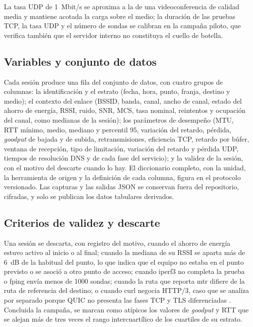 La tasa UDP de 1~Mbit/s se aproxima a la de una videoconferencia de calidad media y mantiene acotada la carga sobre el medio; la duración de las pruebas TCP, la tasa UDP y el número de sondas se calibran en la campaña piloto, que verifica también que el servidor interno no constituya el cuello de botella. 

\subsection{Variables y conjunto de datos}

Cada sesión produce una fila del conjunto de datos, con cuatro grupos de columnas: la identificación y el estrato (fecha, hora, punto, franja, destino y medio); el contexto del enlace (BSSID, banda, canal, ancho de canal, estado del ahorro de energía, RSSI, ruido, SNR, MCS, tasa nominal, reintentos y ocupación del canal, como medianas de la sesión); los parámetros de desempeño (MTU, RTT mínimo, medio, mediano y percentil 95, variación del retardo, pérdida, \textit{goodput} de bajada y de subida, retransmisiones, eficiencia TCP, retardo por búfer, ventana de recepción, tipo de limitación, variación del retardo y pérdida UDP, tiempos de resolución DNS y de cada fase del servicio); y la validez de la sesión, con el motivo del descarte cuando lo hay. El diccionario completo, con la unidad, la herramienta de origen y la definición de cada columna, figura en el protocolo versionado. Las capturas y las salidas JSON se conservan fuera del repositorio, cifradas, y solo se publican los datos tabulares derivados.

\subsection{Criterios de validez y descarte}

Una sesión se descarta, con registro del motivo, cuando el ahorro de energía estuvo activo al inicio o al final; cuando la mediana de su RSSI se aparta más de 6~dB de la habitual del punto, lo que indica que el equipo no estaba en el punto previsto o se asoció a otro punto de acceso; cuando iperf3 no completa la prueba o fping envía menos de 1000 sondas; cuando la ruta que reporta mtr difiere de la ruta de referencia del destino; o cuando curl negocia HTTP/3, caso que se analiza por separado porque QUIC no presenta las fases TCP y TLS diferenciadas \cite{rfc9114}. Concluida la campaña, se marcan como atípicos los valores de \textit{goodput} y RTT que se alejan más de tres veces el rango intercuartílico de los cuartiles de su estrato. 

